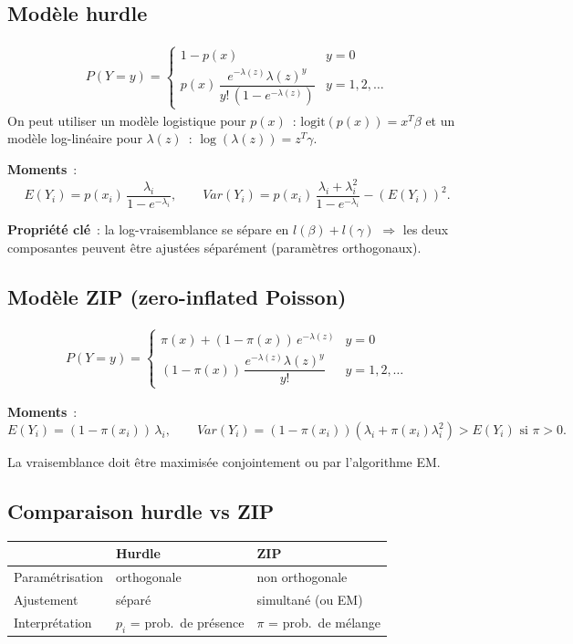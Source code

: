 \documentclass[11pt,letterpaper]{article}
\begin{document}
\subsection{Modèle hurdle}

\begin{align*}
P(Y=y) = \begin{cases}
1-p(x) & y=0\\
p(x)\,\dfrac{e^{-\lambda(z)}\lambda(z)^y}{y!\,(1-e^{-\lambda(z)})} & y=1,2,\ldots
\end{cases}
\end{align*}
On peut utiliser un modèle logistique pour $p(x)$~: $\text{logit}(p(x)) = x^T\beta$ et un modèle log-linéaire pour $\lambda(z)$~: $\log(\lambda(z)) = z^T\gamma$.

\textbf{Moments}~:
$$E(Y_i) = p(x_i)\,\frac{\lambda_i}{1-e^{-\lambda_i}}, \qquad Var(Y_i) = p(x_i)\,\frac{\lambda_i + \lambda_i^2}{1-e^{-\lambda_i}} - (E(Y_i))^2.$$

\textbf{Propriété clé}~: la log-vraisemblance se sépare en $l(\beta) + l(\gamma)$ $\Rightarrow$ les deux composantes peuvent être ajustées séparément (paramètres orthogonaux).

\subsection{Modèle ZIP (zero-inflated Poisson)}

\begin{align*}
P(Y=y) = \begin{cases}
\pi(x) + (1-\pi(x))\,e^{-\lambda(z)} & y=0\\
(1-\pi(x))\,\dfrac{e^{-\lambda(z)}\lambda(z)^y}{y!} & y=1,2,\ldots
\end{cases}
\end{align*}

\textbf{Moments}~:
$$E(Y_i) = (1-\pi(x_i))\,\lambda_i, \qquad Var(Y_i) = (1-\pi(x_i))(\lambda_i + \pi(x_i)\lambda_i^2) > E(Y_i) \text{ si } \pi > 0.$$

La vraisemblance doit être maximisée conjointement ou par l'algorithme EM.

\subsection{Comparaison hurdle vs ZIP}

\begin{center}
\begin{tabular}{l|l|l}
& \textbf{Hurdle} & \textbf{ZIP} \\
\hline
Paramétrisation & orthogonale & non orthogonale \\
Ajustement & séparé & simultané (ou EM) \\
Interprétation & $p_i$ = prob.\ de présence & $\pi$ = prob.\ de mélange \\
\end{tabular}
\end{center}
\end{document}
